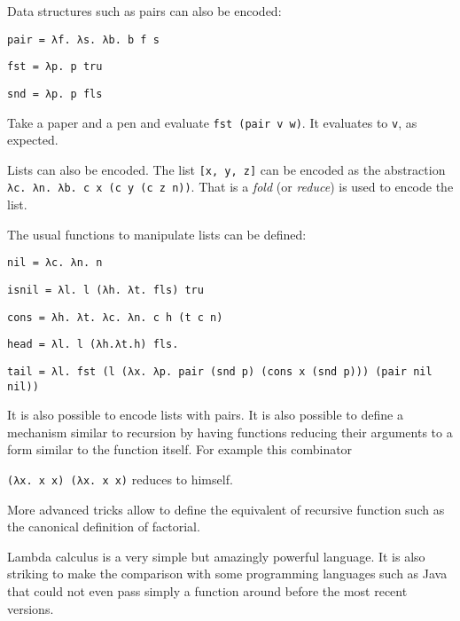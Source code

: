\documentclass[11pt]{article}
\begin{document}
Data structures such as pairs can also be encoded: 

\texttt{pair = λf. λs. λb. b f s}

\texttt{fst = λp. p tru}

\texttt{snd = λp. p fls}

Take a paper and a pen and evaluate \texttt{fst (pair v w)}. It evaluates to
\texttt{v}, as expected.

Lists can also be encoded. The list \texttt{[x, y, z]} can be encoded as the
abstraction \texttt{λc. λn. λb. c x (c y (c z n))}. That is a \emph{fold} (or
\emph{reduce}) is used to encode the list.

The usual functions to manipulate lists can be defined:

\texttt{nil = λc. λn. n}

\texttt{isnil = λl. l (λh. λt. fls) tru}

\texttt{cons = λh. λt. λc. λn. c h (t c n)}

\texttt{head = λl. l (λh.λt.h) fls.}

\texttt{tail = λl. fst (l (λx. λp. pair (snd p) (cons x (snd p))) (pair nil nil))}

It is also possible to encode lists with pairs. It is also possible to
define a mechanism similar to recursion by having functions reducing
their arguments to a form similar to the function itself. For example
this combinator

\texttt{(λx. x x) (λx. x x)} reduces to himself. 

More advanced tricks allow to define the equivalent of recursive
function such as the canonical definition of factorial.

Lambda calculus is a very simple but amazingly powerful language. It
is also striking to make the comparison with some programming
languages such as Java that could not even pass simply a function
around before the most recent versions. 
\end{document}
